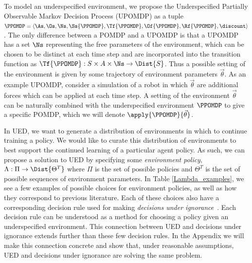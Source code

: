 \documentclass{article}
\begin{document}
To model an underspecified environment, we propose the Underspecified Partially Observable Markov Decision Process (UPOMDP) as a tuple $\PPOMDP = \langle \As,\Os, \Ns, \Ss{\PPOMDP}, \Tf{\PPOMDP},\Of{\PPOMDP},\Rf{\PPOMDP},\discount \rangle$. 
The only difference between a POMDP and a UPOMDP is that a UPOMDP has a set $\Ns$ representing the free parameters of the environment, which can be chosen to be distinct at each time step and are incorporated into the transition function as $\Tf{\PPOMDP}: S \times A \times \Ns \rightarrow \Dist{S}$.  Thus a possible setting of the environment is given by some trajectory of environment parameters $\vec{\theta}$.  As an example UPOMDP, consider a simulation of a robot in which $\vec{\theta}$ are additional forces which can be applied at each time step.  A setting of the environment $\vec{\theta}$ can be naturally combined with the underspecified environment $\PPOMDP$ to give a specific POMDP, which we will denote $\apply{\PPOMDP}{\vec{\theta}}$.


In UED, we want to generate a distribution of environments in which to continue training a policy.  We would like to curate this distribution of environments to best support the continued learning of a particular agent policy.  As such, we 
can propose a solution to UED by 
specifying some \emph{environment policy}, $\Lambda: \Pi \rightarrow \Dist{\Theta^T}$ where $\Pi$ is the set of possible policies
and $\Theta^T$ is the set of possible sequences of environment parameters. 
In Table \ref{Lambda_examples}, we see a few examples of possible choices for environment policies, as well as how they correspond to previous literature.  
Each of these choices also have a corresponding decision rule used for making \emph{decisions under ignorance}~\citep{peterson2017introduction}.  Each decision rule can be understood as a method for choosing a policy given an underspecified environment.  This connection between UED and decisions under ignorance extends further than these few decision rules.  In the Appendix we will make this connection concrete and show that, under reasonable assumptions, UED and decisions under ignorance are solving the same problem.
\end{document}
